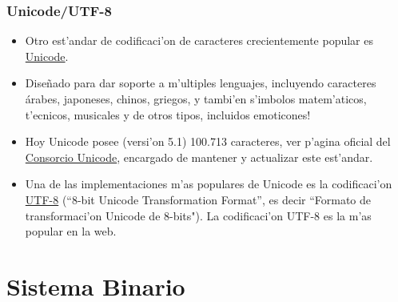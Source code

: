 \documentclass{beamer}
\begin{document}
\begin{frame}[fragile]\frametitle{Unicode/UTF-8}
\begin{itemize}
\item Otro est'andar de codificaci'on de caracteres crecientemente popular es \href{https://es.wikipedia.org/wiki/Unicode}{Unicode}. 
\item Dise\~nado para dar soporte a m'ultiples lenguajes, incluyendo caracteres árabes, japoneses, chinos, griegos, y tambi'en s'imbolos matem'aticos, t'ecnicos, musicales y de otros tipos, incluidos emoticones! 
\item Hoy Unicode posee (versi'on 5.1) 100.713 caracteres, ver p'agina oficial del \href{http://www.unicode.org/charts/}{Consorcio Unicode}, encargado de mantener y actualizar este est'andar. 
\item Una de las implementaciones m'as populares de Unicode es la codificaci'on \href{https://es.wikipedia.org/wiki/UTF-8}{UTF-8} (``8-bit Unicode Transformation Format'', es decir ``Formato de transformaci'on Unicode de 8-bits"). La codificaci'on UTF-8 es la m'as popular en la web.
\end{itemize}
\end{frame}


\section{Sistema Binario}

\end{document}
